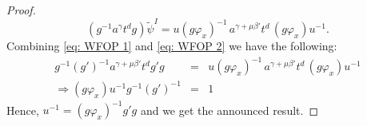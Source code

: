 \documentclass[a4paper]{amsart}
\theoremstyle{definition}
\begin{document}
\begin{proof}
\begin{equation}
     (g^{-1} a^{\gamma}t^d g)\widetilde{\psi}^I = u (g\varphi_x)^{-1} \, a^{\gamma + \mu \beta'} t^d \, (g\varphi_x) u^{-1}.
\end{equation}
%
Combining \eqref{eq: WFOP 1} and \eqref{eq: WFOP 2} we have the following:
%
$$
\begin{array}{ccl}
    g^{-1}(g')^{-1} a^{\gamma+\mu\beta'}t^d g'g & = &   u (g\varphi_x)^{-1} \, a^{\gamma + \mu \beta'} t^d \, (g\varphi_x) u^{-1}\\
    \Rightarrow (g\varphi_x) u^{-1}g^{-1}(g')^{-1} & = & 1
\end{array}
$$
Hence, $u^{-1} =  (g\varphi_x)^{-1}g'g$ and we get the announced result.
\end{proof}







\bigskip 






\vspace{1.0 cm}
\end{document}
